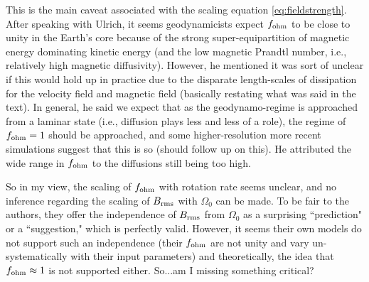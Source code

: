 \documentclass[12pt]{article} %
\begin{document}
This is the main caveat associated with the scaling equation \eqref{eq:fieldstrength}. After speaking with Ulrich, it seems geodynamicists expect $f_{\rm{ohm}}$ to be close to unity in the Earth's core because of the strong super-equipartition of magnetic energy dominating kinetic energy (and the low magnetic Prandtl number, i.e., relatively high magnetic diffusivity). However, he mentioned it was sort of unclear if this would hold up in practice due to the disparate length-scales of dissipation for the velocity field and magnetic field (basically restating what was said in the text). In general, he said we expect that as the geodynamo-regime is approached from a laminar state (i.e., diffusion plays less and less of a role), the regime of $f_{\rm{ohm}}=1$ should be approached, and some higher-resolution more recent simulations suggest that this is so (should follow up on this).  He attributed the wide range in $f_{\rm{ohm}}$ to the diffusions still being too high. 


So in my view, the scaling of $f_{\rm{ohm}}$ with rotation rate seems unclear, and no inference regarding the scaling of $B_{\rm{rms}}$ with $\Omega_0$  can be made. To be fair to the authors, they offer the independence of $B_{\rm{rms}}$ from $\Omega_0$ as a surprising ``prediction" or a ``suggestion," which is perfectly valid. However, it seems their own models do not support such an independence (their $f_{\rm{ohm}}$ are not unity and vary un-systematically with their input parameters) and theoretically, the idea that $f_{\rm{ohm}}\approx1$ is not supported either. So...am I missing something critical? 


\end{document}
